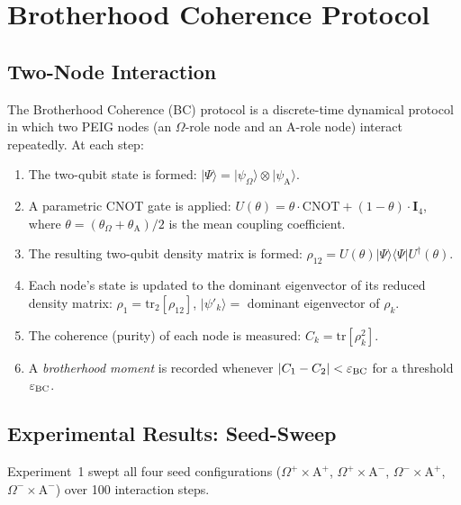 \documentclass[12pt]{article}
\newcommand{\Alpha}{\mathrm{A}}
\newcommand{\ket}[1]{|#1\rangle}
\newcommand{\bra}[1]{\langle #1|}
\newcommand{\tr}{\mathrm{tr}}
\begin{document}
\section{Brotherhood Coherence Protocol}
\label{sec:brotherhood}

\subsection{Two-Node Interaction}

The Brotherhood Coherence (BC) protocol is a discrete-time dynamical
protocol in which two PEIG nodes (an $\Omega$-role node and an
$\Alpha$-role node) interact repeatedly.  At each step:

\begin{enumerate}
\item The two-qubit state is formed: $\ket{\Psi} = \ket{\psi_\Omega}\otimes\ket{\psi_\Alpha}$.
\item A parametric CNOT gate is applied:
  $U(\theta) = \theta\cdot\mathrm{CNOT} + (1-\theta)\cdot\mathbf{I}_4$,
  where $\theta = (\theta_\Omega+\theta_\Alpha)/2$ is the mean coupling
  coefficient.
\item The resulting two-qubit density matrix is formed:
  $\rho_{12} = U(\theta)\ket{\Psi}\bra{\Psi}U^\dagger(\theta)$.
\item Each node's state is updated to the dominant eigenvector of its
  reduced density matrix:
  $\rho_1 = \tr_2[\rho_{12}]$, $\ket{\psi'_k} = $ dominant eigenvector of $\rho_k$.
\item The coherence (purity) of each node is measured:
  $C_k = \tr[\rho_k^2]$.
\item A \emph{brotherhood moment} is recorded whenever
  $|C_1 - C_2| < \varepsilon_{\rm BC}$ for a threshold $\varepsilon_{\rm BC}$.
\end{enumerate}

\subsection{Experimental Results: Seed-Sweep}
\label{subsec:brotherhood_results}

Experiment~1 swept all four seed configurations
($\Omega^+ \times \Alpha^+$, $\Omega^+ \times \Alpha^-$,
$\Omega^- \times \Alpha^+$, $\Omega^- \times \Alpha^-$) over 100
interaction steps.
\end{document}
